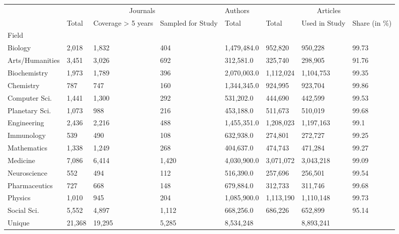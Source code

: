 \begin{tabular}{llllllll}
\toprule
{} & \multicolumn{3}{c}{Journals} &     Authors & \multicolumn{3}{c}{Articles} \\
{} &    Total & Coverage > 5 years & Sampled for Study &       Total &      Total & Used in Study & Share (in \%) \\
Field           &          &                    &                   &             &            &               &              \\
\midrule
Biology         &    2,018 &              1,832 &               404 & 1,479,484.0 &    952,820 &       950,228 &        99.73 \\
Arts/Humanities &    3,451 &              3,026 &               692 &   312,581.0 &    325,740 &       298,905 &        91.76 \\
Biochemistry    &    1,973 &              1,789 &               396 & 2,070,003.0 &  1,112,024 &     1,104,753 &        99.35 \\
Chemistry       &      787 &                747 &               160 & 1,344,345.0 &    924,995 &       923,704 &        99.86 \\
Computer Sci.   &    1,441 &              1,300 &               292 &   531,202.0 &    444,690 &       442,599 &        99.53 \\
Planetary Sci.  &    1,073 &                988 &               216 &   453,188.0 &    511,673 &       510,019 &        99.68 \\
Engineering     &    2,436 &              2,216 &               488 & 1,455,351.0 &  1,208,023 &     1,197,163 &         99.1 \\
Immunology      &      539 &                490 &               108 &   632,938.0 &    274,801 &       272,727 &        99.25 \\
Mathematics     &    1,338 &              1,249 &               268 &   404,637.0 &    474,743 &       471,284 &        99.27 \\
Medicine        &    7,086 &              6,414 &             1,420 & 4,030,900.0 &  3,071,072 &     3,043,218 &        99.09 \\
Neuroscience    &      552 &                494 &               112 &   516,390.0 &    257,696 &       256,501 &        99.54 \\
Pharmaceutics   &      727 &                668 &               148 &   679,884.0 &    312,733 &       311,746 &        99.68 \\
Physics         &    1,010 &                945 &               204 & 1,085,900.0 &  1,113,190 &     1,110,148 &        99.73 \\
Social Sci.     &    5,552 &              4,897 &             1,112 &   668,256.0 &    686,226 &       652,899 &        95.14 \\
Unique          &   21,368 &             19,295 &             5,285 &   8,534,248 &            &     8,893,241 &              \\
\bottomrule
\end{tabular}
